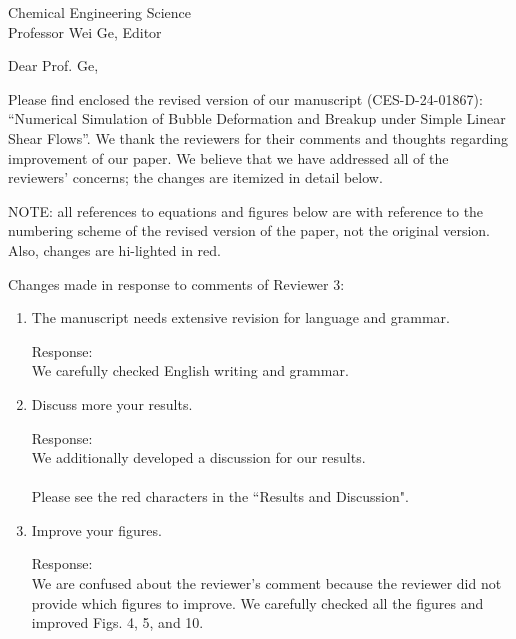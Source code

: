 \documentclass{letter}
\date{\today}
\begin{document}
\begin{letter}{
Chemical Engineering Science\\
Professor Wei Ge, Editor\\}

\opening{Dear Prof. Ge,}

Please find enclosed the revised version of our manuscript (CES-D-24-01867):
``Numerical Simulation of Bubble Deformation and Breakup under 
Simple Linear Shear Flows''.
We thank the reviewers for their comments and thoughts regarding improvement 
of our paper. We believe that we have addressed all of the reviewers’ 
concerns; the changes are itemized in detail below.

\par\noindent
NOTE: all references to equations and figures below are with
reference to the numbering scheme of the revised version of the paper,
not the original version.  Also, changes are hi-lighted in red.
\par\noindent

Changes made in response to comments of Reviewer 3: \begin{enumerate}
\item
\textsf
{The manuscript needs extensive revision for language and grammar.}
\vspace{3 mm}

Response: \\
We carefully checked English writing and grammar.\\

\item
\textsf
{Discuss more your results.}
\vspace{3 mm}

Response: \\
We additionally developed a discussion for our results.\\
\\
Please see the red characters in the ``Results and Discussion".
\\

\par\noindent
\item
\textsf
{Improve your figures.}
\vspace{3 mm}

Response: \\
We are confused about the reviewer's comment because the reviewer did not provide which figures to improve.
We carefully checked all the figures and improved Figs. 4, 5, and 10.\\
\\


\end{enumerate}
\end{letter}
\end{document}

